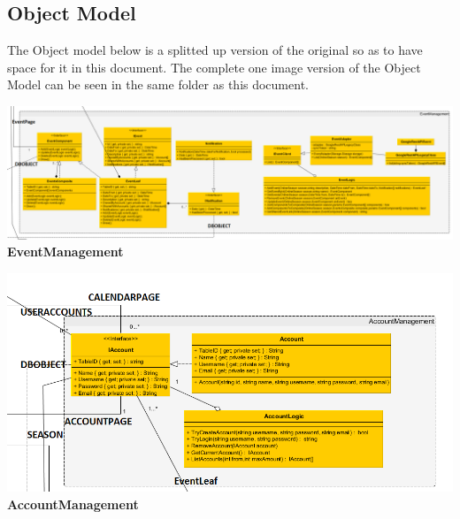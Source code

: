 \documentclass[a4paper]{article}
\begin{document}
\subsection{Object Model}
The Object model below is a splitted up version of the original so as to have space for it in this document. The complete one image version of the Object Model can be seen in the same folder as this document.


\begin{table}
\centering
	\includegraphics[width=1.3\textwidth]{EventManagement.png}\\
\caption{\textbf{EventManagement}}
\end{table}

\begin{table}
\centering
	\includegraphics[width=1.3\textwidth]{AccountManagement.png}\\
\caption{\textbf{AccountManagement}}
\end{table}
\end{document}
